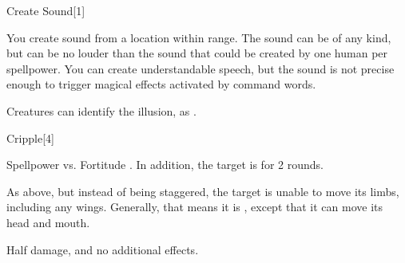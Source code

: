 \begin{spellsection}{Create Sound}[1]
    \begin{spellheader}
    \end{spellheader}
    \begin{spellcontent}
        \begin{spelltargetinginfo}
            \spellrng{\rngmed}
        \end{spelltargetinginfo}
        \begin{spelleffects}
            \spelleffect You create sound from a location within range. The sound can be of any kind, but can be no louder than the sound that could be created by one human per spellpower. You can create understandable speech, but the sound is not precise enough to trigger magical effects activated by command words.
            \spelldur \durshort \dismissable
        \end{spelleffects}
    \end{spellcontent}
    \begin{spellfooter}
        \spellnotes Creatures can identify the illusion, as .
        \miscastexplode
    \end{spellfooter}
\end{spellsection}

\begin{spellsection}{Cripple}[4]
    \begin{spellheader}
    \end{spellheader}
    \begin{spellcontent}
        \begin{spelltargetinginfo}
        \end{spelltargetinginfo}
        \begin{spelleffects}
            \begin{spellattack}{Spellpower vs. Fortitude}
                \spellsuccess {}. In addition, the target is \staggered for 2 rounds.

                \spellcritical As above, but instead of being staggered, the target is unable to move its limbs, including any wings. Generally, that means it is \paralyzed, except that it can move its head and mouth.

                \spellfailure Half damage, and no additional effects.
            \end{spellattack}
        \end{spelleffects}
    \end{spellcontent}
    \begin{spellfooter}
        \miscastrandom
    \end{spellfooter}
    \begin{spellaugments}
    \end{spellaugments}
\end{spellsection}

